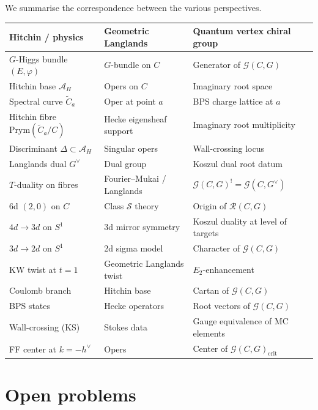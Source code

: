 \documentclass[11pt]{article}
\theoremstyle{definition}
\theoremstyle{remark}
\newcommand{\cA}{\mathcal{A}}
\newcommand{\Prym}{\mathrm{Prym}}
\newcommand{\Etwo}{E_2}
\begin{document}
We summarise the correspondence between the various perspectives.

\medskip

\begin{center}
\renewcommand{\arraystretch}{1.4}
\begin{tabular}{@{}p{3.5cm}p{3.5cm}p{4.2cm}@{}}
\hline
\textbf{Hitchin / physics} & \textbf{Geometric Langlands} & \textbf{Quantum vertex chiral group} \\
\hline
$G$-Higgs bundle $(E, \varphi)$ & $G$-bundle on $C$ & Generator of $\mathcal{G}(C,G)$ \\
Hitchin base $\cA_H$ & Opers on $C$ & Imaginary root space \\
Spectral curve $\widetilde{C}_a$ & Oper at point $a$ & BPS charge lattice at $a$ \\
Hitchin fibre $\Prym(\widetilde{C}_a/C)$ & Hecke eigensheaf support & Imaginary root multiplicity \\
Discriminant $\Delta \subset \cA_H$ & Singular opers & Wall-crossing locus \\
Langlands dual $G^\vee$ & Dual group & Koszul dual root datum \\
$T$-duality on fibres & Fourier--Mukai / Langlands & $\mathcal{G}(C,G)^! = \mathcal{G}(C,G^\vee)$ \\
6d $(2,0)$ on $C$ & Class $\mathcal{S}$ theory & Origin of $\mathcal{R}(C,G)$ \\
$4d \to 3d$ on $S^1$ & 3d mirror symmetry & Koszul duality at level of targets \\
$3d \to 2d$ on $S^1$ & 2d sigma model & Character of $\mathcal{G}(C,G)$ \\
KW twist at $t=1$ & Geometric Langlands twist & $\Etwo$-enhancement \\
Coulomb branch & Hitchin base & Cartan of $\mathcal{G}(C,G)$ \\
BPS states & Hecke operators & Root vectors of $\mathcal{G}(C,G)$ \\
Wall-crossing (KS) & Stokes data & Gauge equivalence of MC elements \\
FF center at $k = -h^\vee$ & Opers & Center of $\mathcal{G}(C,G)_{\mathrm{crit}}$ \\
\hline
\end{tabular}
\end{center}


\section{Open problems}
\label{sec:open-problems}
\end{document}
